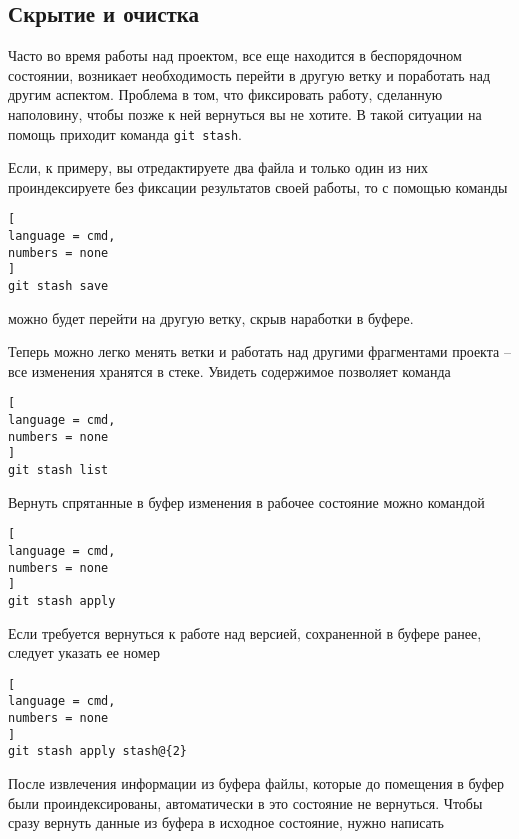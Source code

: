\documentclass[%
	11pt,
	a4paper,
	utf8,
		]{article}
\begin{document}
\subsection{Скрытие и очистка}

Часто во время работы над проектом, все еще находится в беспорядочном состоянии, возникает необходимость перейти в другую ветку и поработать над другим аспектом. Проблема в том, что фиксировать работу, сделанную наполовину, чтобы позже к ней вернуться вы не хотите. В такой ситуации на помощь приходит команда \texttt{git stash}.

Если, к примеру, вы отредактируете два файла и только один из них проиндексируете без фиксации результатов своей работы, то с помощью команды
\begin{lstlisting}[
language = cmd,
numbers = none
]
git stash save
\end{lstlisting}
можно будет перейти на другую ветку, скрыв наработки в буфере.


Теперь можно легко менять ветки и работать над другими фрагментами проекта -- все изменения хранятся в стеке. Увидеть содержимое позволяет команда

\begin{lstlisting}[
language = cmd,
numbers = none
]
git stash list
\end{lstlisting}

Вернуть спрятанные в буфер изменения в рабочее состояние можно командой

\begin{lstlisting}[
language = cmd,
numbers = none
]
git stash apply
\end{lstlisting}

Если требуется вернуться к работе над версией, сохраненной в буфере ранее, следует указать ее номер

\begin{lstlisting}[
language = cmd,
numbers = none
]
git stash apply stash@{2}
\end{lstlisting}


После извлечения информации из буфера файлы, которые до помещения в буфер были проиндексированы, автоматически в это состояние не вернуться. Чтобы сразу вернуть данные из буфера в исходное состояние, нужно написать
\end{document}
